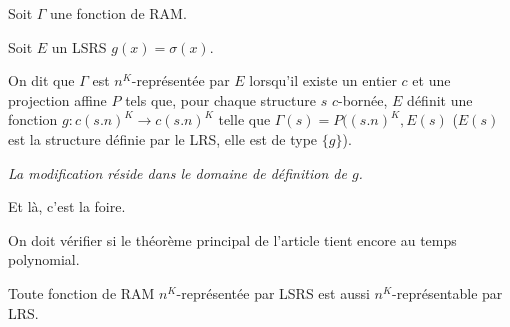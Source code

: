 \documentclass{article}
\begin{document}
		\begin{definition}
			\label{def:representee_par_LRS}
			Soit $\Gamma$ une fonction de RAM. 
			
			Soit $E$ un LSRS $g(x) = \sigma(x)$. 
			
			On dit que $\Gamma$ est $n^K$-représentée par $E$ lorsqu'il existe un entier $c$ et une projection affine $P$ tels que, pour chaque structure $s$ $c$-bornée, $E$ définit une fonction $g : c (s.n)^K \to c (s.n)^K$ telle que $\Gamma(s) = P((s.n)^K, E(s)$ ($E(s)$ est la structure définie par le LRS, elle est de type $\{g\}$).
			
			\emph{La modification réside dans le domaine de définition de $g$.}
		\end{definition}
		
		Et là, c'est la foire.
		
		On doit vérifier si le théorème principal de l'article tient encore au temps polynomial.
		
		
		
		\begin{conj}
			\label{conj:rep_LSRS_rep_LRS}
			Toute fonction de RAM $n^K$-représentée par LSRS est aussi $n^K$-représentable par LRS.
		\end{conj}
		
\end{document}
